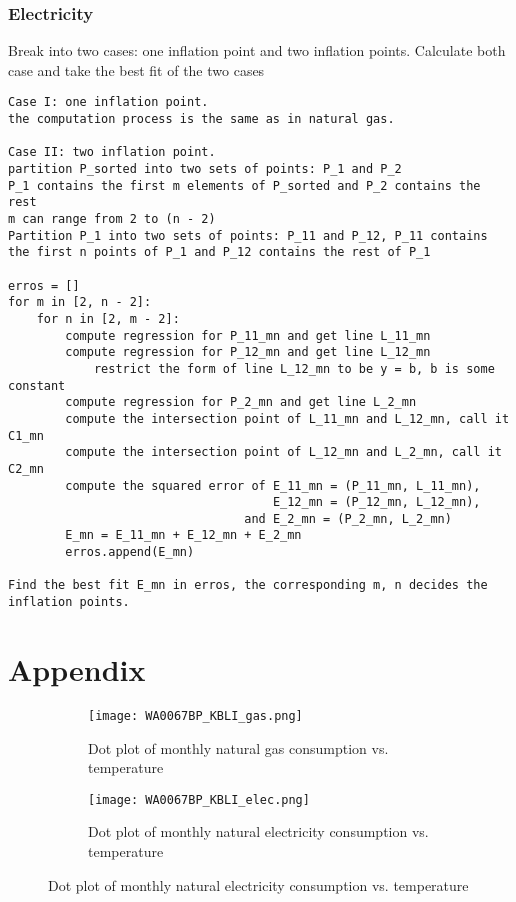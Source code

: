 \documentclass[12pt]{article}
\begin{document}
\subsubsection{Electricity}
Break into two cases: one inflation point and two inflation points.
Calculate both case and take the best fit of the two cases
\begin{verbatim}
Case I: one inflation point. 
the computation process is the same as in natural gas.

Case II: two inflation point. 
partition P_sorted into two sets of points: P_1 and P_2
P_1 contains the first m elements of P_sorted and P_2 contains the
rest
m can range from 2 to (n - 2)
Partition P_1 into two sets of points: P_11 and P_12, P_11 contains the first n points of P_1 and P_12 contains the rest of P_1

erros = []
for m in [2, n - 2]:
    for n in [2, m - 2]:
        compute regression for P_11_mn and get line L_11_mn
        compute regression for P_12_mn and get line L_12_mn
            restrict the form of line L_12_mn to be y = b, b is some constant
        compute regression for P_2_mn and get line L_2_mn
        compute the intersection point of L_11_mn and L_12_mn, call it C1_mn
        compute the intersection point of L_12_mn and L_2_mn, call it C2_mn
        compute the squared error of E_11_mn = (P_11_mn, L_11_mn), 
                                     E_12_mn = (P_12_mn, L_12_mn),
                                 and E_2_mn = (P_2_mn, L_2_mn)
        E_mn = E_11_mn + E_12_mn + E_2_mn
        erros.append(E_mn)

Find the best fit E_mn in erros, the corresponding m, n decides the inflation points.
\end{verbatim}
\pagebreak
\section{Appendix}
\begin{figure}[h!]
  \centering
  \begin{subfigure}{.4\textwidth}
  \centering
  \texttt{[image: WA0067BP\_KBLI\_gas.png]}
  \caption{Dot plot of monthly natural gas consumption vs. temperature}
  \label{fig:WA0067BP_KBLI_gas}
\end{subfigure}
%
\begin{subfigure}{.4\textwidth}
  \centering
  \texttt{[image: WA0067BP\_KBLI\_elec.png]}
  \caption{Dot plot of monthly natural electricity consumption vs. temperature}
  \label{fig:WA0067BP_KBLI_elec}
\end{subfigure}
\end{figure}
\end{document}
